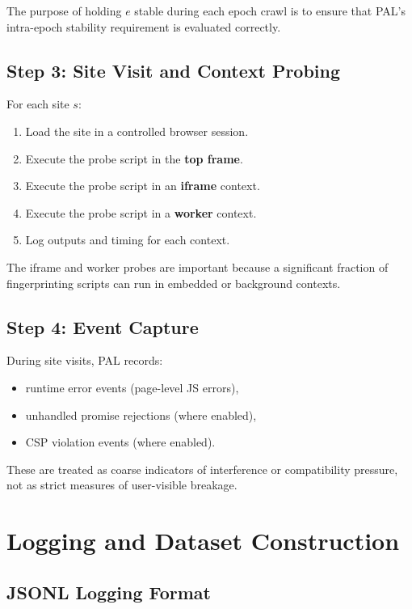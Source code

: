 \documentclass[11pt]{report}
\begin{document}
The purpose of holding $e$ stable during each epoch crawl is to ensure that PAL’s intra-epoch stability requirement is evaluated correctly.

\subsection{Step 3: Site Visit and Context Probing}

For each site $s$:

\begin{enumerate}
    \item Load the site in a controlled browser session.
    \item Execute the probe script in the \textbf{top frame}.
    \item Execute the probe script in an \textbf{iframe} context.
    \item Execute the probe script in a \textbf{worker} context.
    \item Log outputs and timing for each context.
\end{enumerate}

The iframe and worker probes are important because a significant fraction of fingerprinting scripts can run in embedded or background contexts.

\subsection{Step 4: Event Capture}

During site visits, PAL records:

\begin{itemize}
    \item runtime error events (page-level JS errors),
    \item unhandled promise rejections (where enabled),
    \item CSP violation events (where enabled).
\end{itemize}

These are treated as coarse indicators of interference or compatibility pressure, not as strict measures of user-visible breakage.

\section{Logging and Dataset Construction}

\subsection{JSONL Logging Format}
\end{document}
